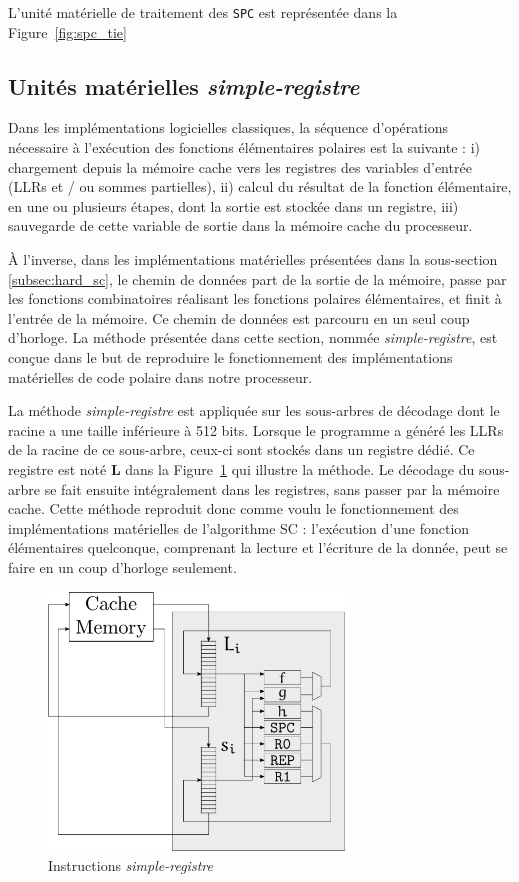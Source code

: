 L'unité matérielle de traitement des \noeuds \texttt{SPC} est représentée dans la Figure~\ref{fig:spc_tie}

\subsection{Unités matérielles \textit{simple-registre}}

Dans les implémentations logicielles classiques, la séquence d'opérations nécessaire à l'exécution des fonctions élémentaires polaires est la suivante : i) chargement depuis la mémoire cache vers les registres des variables d'entrée (LLRs et / ou sommes partielles), ii) calcul du résultat de la fonction élémentaire, en une ou plusieurs étapes, dont la sortie est stockée dans un registre, iii) sauvegarde de cette variable de sortie dans la mémoire cache du processeur.

\`A l'inverse, dans les implémentations matérielles présentées dans la sous-section \ref{subsec:hard_sc}, le chemin de données part de la sortie de la mémoire, passe par les fonctions combinatoires réalisant les fonctions polaires élémentaires, et finit à l'entrée de la mémoire. Ce chemin de données est parcouru en un seul coup d'horloge. La méthode présentée dans cette section, nommée \textit{simple-registre}, est conçue dans le but de reproduire le fonctionnement des implémentations matérielles de code polaire dans notre processeur.


La méthode \textit{simple-registre} est appliquée sur les sous-arbres de décodage dont le \noeud racine a une taille inférieure à 512 bits.
Lorsque le programme a généré les LLRs de la racine de ce sous-arbre, ceux-ci sont stockés dans un registre dédié.
Ce registre est noté $\mathbold{L}$ dans la Figure~\ref{fig:simple-registre} qui illustre la méthode.
Le décodage du sous-arbre se fait ensuite intégralement dans les registres, sans passer par la mémoire cache.
Cette méthode reproduit donc comme voulu le fonctionnement des implémentations matérielles de l'algorithme SC : l'exécution d'une fonction élémentaires quelconque, comprenant la lecture et l'écriture de la donnée, peut se faire en un coup d'horloge seulement.

\begin{figure}[t]
\centering
\includegraphics[width=0.7\textwidth]{main/ch3_fig/in_register}
\caption{Instructions \textit{simple-registre}}
\label{fig:simple-registre}
\end{figure}

